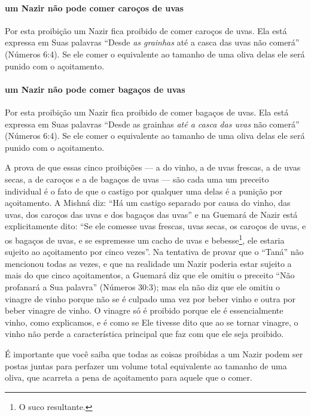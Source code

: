 \paragraph{um Nazir não pode comer caroços de uvas}

Por esta proibição um Nazir fica proibido de comer caroços de uvas. Ela
está expressa em Suas palavras ``Desde \emph{as grainhas} até a casca
das uvas não comerá'' (Números 6:4). Se ele comer o equivalente ao
tamanho de uma oliva delas ele será punido com o açoitamento.

\paragraph{um Nazir não pode comer bagaços de uvas}

Por esta proibição um Nazir fica proibido de comer bagaços de uvas. Ela
está expressa em Suas palavras ``Desde as grainhas \emph{até a casca das
uvas} não comerá'' (Números 6:4). Se ele comer o equivalente ao tamanho
de uma oliva delas ele será punido com o açoitamento.

A prova de que essas cinco proibições --- a do vinho, a de uvas
frescas, a de uvas secas, a de caroços e a de bagaços de uvas --- são
cada uma um preceito individual é o fato de que o castigo por qualquer uma delas é a
punição por açoitamento. A Mishná diz: ``Há um castigo separado por
causa do vinho, das uvas, dos caroços das uvas e dos bagaços das uvas''
e na Guemará de Nazir está explicitamente dito: ``Se ele comesse uvas
frescas, uvas secas, os caroços de uvas, e os bagaços de uvas, e se
espremesse um cacho de uvas e bebesse\footnote{O suco resultante.}, ele estaria
sujeito ao açoitamento por cinco vezes''. Na tentativa de provar que o
``Taná'' não mencionou todas as vezes, e que na realidade um Nazir
poderia estar sujeito a mais do que cinco açoitamentos, a Guemará diz
que ele omitiu o preceito ``Não profanará a Sua palavra'' (Números
30:3); mas ela não diz que ele omitiu o vinagre de vinho porque não se é
culpado uma vez por beber vinho e outra por beber vinagre de vinho. O
vinagre só é proibido porque ele é essencialmente vinho, como
explicamos, e é como se Ele tivesse dito que ao se tornar vinagre, o
vinho não perde a característica principal que faz com que ele seja
proibido.

É importante que você saiba que todas as coisas proibidas a um Nazir
podem ser postas juntas para perfazer um volume total equivalente ao
tamanho de uma oliva, que acarreta a pena de açoitamento para aquele
que o comer.

